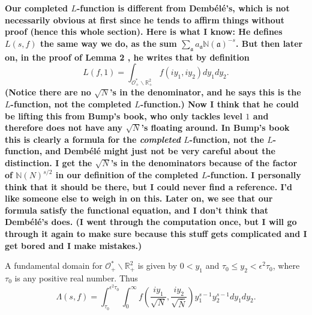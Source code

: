 \documentclass{article}
\theoremstyle{plain}
\begin{document}
\textbf{Our completed $L$-function is different from Demb\'{e}l\'{e}'s, which is not necessarily obvious at first since he tends to affirm things without proof (hence this whole section). Here is what I know: He defines $L(s,f)$ the same way we do, as the sum $\sum_{\mathfrak{a}}a_{\mathfrak{a}}\mathbb{N}(\mathfrak{a})^{-s}$. But then later on, in the proof of Lemma 2 \cite{dembele}, he writes that by definition
\begin{equation*}
L(f,1)= \int_{\mathcal{O}_+^*\backslash \mathbb{R}^2_+} f\left(iy_1,iy_2\right) dy_1 dy_2.
\end{equation*}
(Notice there are no $\sqrt{N}$'s in the denominator, and he says this is the $L$-function, not the completed $L$-function.) Now I think that he could be lifting this from Bump's book, who only tackles level $1$ and therefore does not have any $\sqrt{N}$'s floating around. In Bump's book this is clearly a formula for the \emph{completed} $L$-function, not the $L$-function, and Demb\'{e}l\'{e} might just not be very careful about the distinction. I get the $\sqrt{N}$'s in the denominators because of the factor of $\mathbb{N}(N)^{s/2}$ in our definition of the completed $L$-function. I personally think that it should be there, but I could never find a reference. I'd like someone else to weigh in on this. Later on, we see that our formula satisfy the functional equation, and I don't think that Demb\'{e}l\'{e}'s does. (I went through the computation once, but I will go through it again to make sure because this stuff gets complicated and I get bored and I make mistakes.)}

A fundamental domain for $\mathcal{O}_+^*\backslash \mathbb{R}^2_+$ is given by $0<y_1$ and $\tau_0 \leq y_2 < \epsilon^2 \tau_0$, where $\tau_0$ is any positive real number. Thus
\begin{equation*}
\Lambda(s,f)= \int_{\tau_0}^{\epsilon^2 \tau_0}\int_{0}^{\infty} f\left(\frac{iy_1}{\sqrt{N}},\frac{iy_2}{\sqrt{\bar{N}}}\right) y_1^{s-1}y_2^{s-1} dy_1 dy_2.
\end{equation*}
\end{document}
